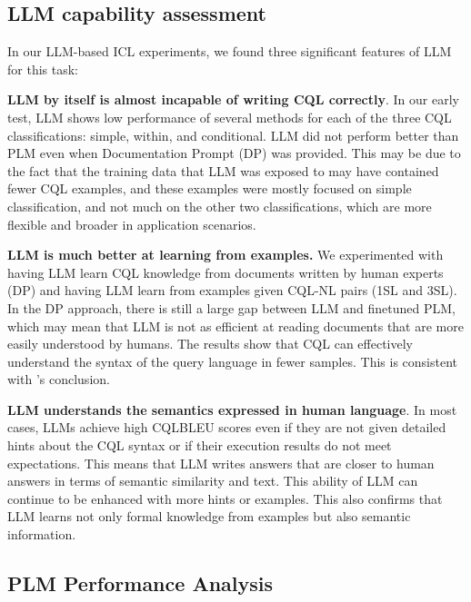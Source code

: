 \documentclass[11pt]{article}
\begin{document}
\begin{CJK*}{UTF8}{gbsn}
\subsection{LLM capability assessment}
In our LLM-based ICL experiments, we found three significant features of LLM for this task:

\textbf{LLM by itself is almost incapable of writing CQL correctly}. In our early test, LLM shows low performance of several methods for each of the three CQL classifications: simple, within, and conditional. LLM did not perform better than PLM even when Documentation Prompt (DP) was provided. This may be due to the fact that the training data that LLM was exposed to may have contained fewer CQL examples, and these examples were mostly focused on simple classification, and not much on the other two classifications, which are more flexible and broader in application scenarios.

\textbf{LLM is much better at learning from examples.} We experimented with having LLM learn CQL knowledge from documents written by human experts (DP) and having LLM learn from examples given CQL-NL pairs (1SL and 3SL). In the DP approach, there is still a large gap between LLM and finetuned PLM, which may mean that LLM is not as efficient at reading documents that are more easily understood by humans. The results show that CQL can effectively understand the syntax of the query language in fewer samples. This is consistent with \citet{staniek2023texttooverpassql}'s conclusion.

\textbf{LLM understands the semantics expressed in human language}. In most cases, LLMs achieve high CQLBLEU scores even if they are not given detailed hints about the CQL syntax or if their execution results do not meet expectations. This means that LLM writes answers that are closer to human answers in terms of semantic similarity and text. This ability of LLM can continue to be enhanced with more hints or examples. This also confirms that LLM learns not only formal knowledge from examples but also semantic information.

\subsection{PLM Performance Analysis}


\end{CJK*}
\end{document}
